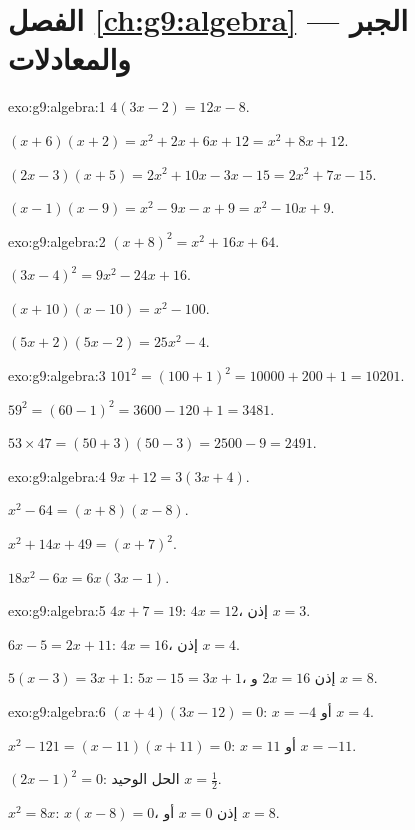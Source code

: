 \section*{الفصل \ref{ch:g9:algebra} --- الجبر والمعادلات}

\begin{solution}{exo:g9:algebra:1}
$4(3x - 2) = 12x - 8$.

$(x+6)(x+2) = x^2 + 2x + 6x + 12 = x^2 + 8x + 12$.

$(2x-3)(x+5) = 2x^2 + 10x - 3x - 15 = 2x^2 + 7x - 15$.

$(x-1)(x-9) = x^2 - 9x - x + 9 = x^2 - 10x + 9$.
\end{solution}

\begin{solution}{exo:g9:algebra:2}
$(x+8)^2 = x^2 + 16x + 64$.

$(3x-4)^2 = 9x^2 - 24x + 16$.

$(x+10)(x-10) = x^2 - 100$.

$(5x+2)(5x-2) = 25x^2 - 4$.
\end{solution}

\begin{solution}{exo:g9:algebra:3}
$101^2 = (100+1)^2 = 10000 + 200 + 1 = 10201$.

$59^2 = (60-1)^2 = 3600 - 120 + 1 = 3481$.

$53 \times 47 = (50+3)(50-3) = 2500 - 9 = 2491$.
\end{solution}

\begin{solution}{exo:g9:algebra:4}
$9x + 12 = 3(3x + 4)$.

$x^2 - 64 = (x+8)(x-8)$.

$x^2 + 14x + 49 = (x+7)^2$.

$18x^2 - 6x = 6x(3x - 1)$.
\end{solution}

\begin{solution}{exo:g9:algebra:5}
$4x + 7 = 19$: $4x = 12$، إذن $x = 3$.

$6x - 5 = 2x + 11$: $4x = 16$، إذن $x = 4$.

$5(x-3) = 3x + 1$: $5x - 15 = 3x + 1$، إذن $2x = 16$ و $x = 8$.
\end{solution}

\begin{solution}{exo:g9:algebra:6}
$(x+4)(3x-12) = 0$: $x = -4$ أو $x = 4$.

$x^2 - 121 = (x-11)(x+11) = 0$: $x = 11$ أو $x = -11$.

$(2x-1)^2 = 0$: الحل الوحيد $x = \frac12$.

$x^2 = 8x$: $x(x - 8) = 0$، إذن $x = 0$ أو $x = 8$.
\end{solution}

